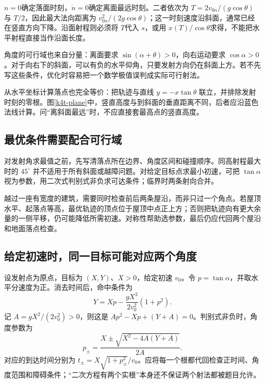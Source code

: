 $n=0$确定落面时刻，$\dot n=0$确定离面最远时刻。二者依次为 $T=2v_{0n}/(g\cos\theta)$与 $T/2$，因此最大法向距离为 $v_{0n}^2/(2g\cos\theta)$；这一时刻速度沿斜面，通常已经在竖直方向下降。沿面射程则必须将 $T$代入 $s$，或用 $x(T)/\cos\theta$求得，不能把水平射程直接当作沿面长度。

角度的可行域也来自分量：离面要求 $\sin(\alpha+\theta)>0$，向右运动要求 $\cos\alpha>0$。对于向右下的斜面，可以有负的水平仰角，只要发射方向仍在斜面上方。若不先写这些条件，优化时容易把一个数学极值误判成实际可行射法。



从水平坐标计算落点也完全等价：把轨迹与直线 $y=-x\tan\theta$ 联立，并排除发射时刻的零根。图\ref{k4t-plane}中，竖直高度与到斜面的垂直距离不同，后者应沿蓝色法线计算。问“离斜面最远”时，不应直接套最高点的竖直高度。

\subsection{最优条件需要配合可行域}
对发射角求最值之前，先写清落点所在边界、角度区间和碰撞顺序。同高射程最大时的 $45^\circ$ 并不适用于所有斜面或越障问题。对给定目标点求最小初速，可把 $\tan\alpha$ 视为参数，用二次式判别式非负求可达条件；临界时两条射向合并。

越过一座有宽度的建筑，需要同时检查前后两条屋沿，而非只过一个角点。若屋顶水平、起落点等高，最优轨迹的顶点位于屋顶中点正上方；否则把轨迹向有更大余量的一侧平移，仍可能降低所需初速。对称性帮助选参数，最后仍应代回两个屋沿和地面落点检查。

\subsection{给定初速时，同一目标可能对应两个角度}
设发射点为原点，目标为 $(X,Y)$、$X>0$，给定初速 $v_0$。令 $p=\tan\alpha$，并取水平分速度为正。消去时间后，命中条件为
\[Y=Xp-\frac{gX^2}{2v_0^2}(1+p^2).
\]
记 $A=gX^2/(2v_0^2)>0$，则这是 $Ap^2-Xp+(Y+A)=0$。判别式非负时，角度参数为
\[p_\pm=\frac{X\pm\sqrt{X^2-4A(Y+A)}}{2A}.\]
对应的到达时间分别为 $t_\pm=X\sqrt{1+p_\pm^2}/v_0$。应将每一个根都代回检查正时间、角度范围和障碍条件；“二次方程有两个实根”本身还不保证两个射法都被题目允许。

